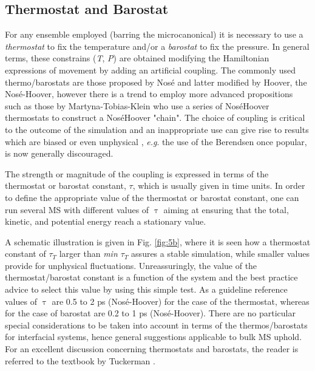 \documentclass[9pt,bestpractices]{livecoms}
\begin{document}
\subsection{Thermostat and Barostat}
\label{sec:thermostat}
For any ensemble employed (barring the microcanonical) it is necessary to use
a \textit{thermostat} to fix the temperature and/or a \textit{barostat} to fix
the pressure. In general terms, these constrains (\textit{T}, \textit{P}) are
obtained modifying the Hamiltonian expressions of movement by adding an
artificial coupling. The commonly used thermo/barostats are those proposed by
Nos\'{e} and latter modified by Hoover, the Nos\'{e}-Hoover\citep{hoover1985},
however there is a trend to employ more advanced propositions such as
those by Martyna-Tobias-Klein \citep{martyna1992} who use a series of
Nos\'{e}\textendash{}Hoover thermostats to construct
a Nos\'{e}\textendash{}Hoover "chain".  The choice of coupling is critical to
the outcome of the simulation \citep{shirts2013}
and an inappropriate use can give rise to results which are biased
or even unphysical \citep{wong2016}, \textit{e.g}. the use of
the Berendsen \citep{berendsen1984}
once popular, is now generally discouraged.

The strength or magnitude of the coupling is expressed in terms of the
thermostat or barostat constant, {${\tau}$}, which is usually given in time
units. In order to define the appropriate value of the thermostat or barostat
constant, one can run several MS with different values of {${\uptau}$} aiming
at ensuring that the total, kinetic, and potential energy reach a stationary
value.

A schematic illustration is given in Fig. \ref{fig:5b}, where it is seen how a thermostat
constant of ${\tau}$$_{T}$ larger than \textit{min ${\tau}$}$_{T}$ assures
a stable simulation, while smaller values provide for unphysical fluctuations.
Unreassuringly, the value of the thermostat/barostat constant is a function of
the system and the best practice advice to select this value by using this
simple test. As a guideline reference values of {${\uptau}$} are 0.5 to 2 ps
(Nos\'{e}-Hoover) for the case of the thermostat, whereas for the case of
barostat are 0.2 to 1 ps (Nos\'{e}-Hoover). There are no particular special
considerations to be taken into account in terms of the thermos/barostats for
interfacial systems, hence general suggestions applicable to bulk MS uphold. For an excellent
discussion concerning thermostats and barostats, the reader is referred to the
textbook by Tuckerman \citep{tuckerman2010}.
\end{document}
